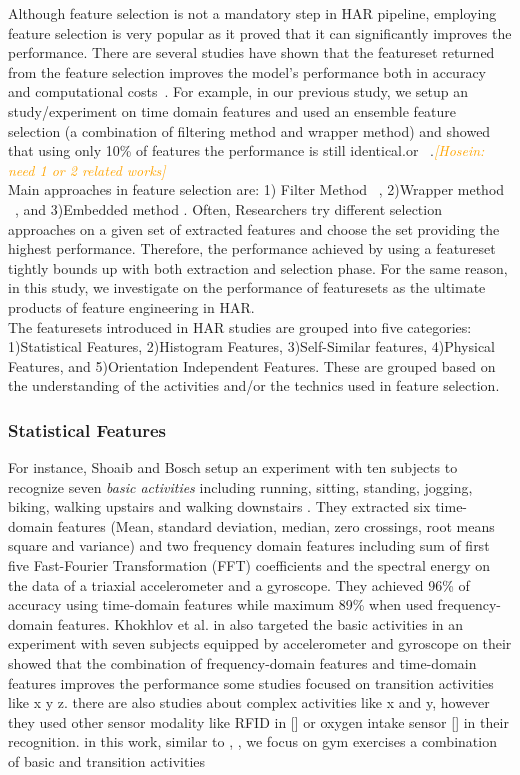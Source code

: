 \documentclass[journal,article,submit,moreauthors,pdftex]{Definitions/mdpi}
\newcommand{\hosein}[1]{\textcolor{orange}{{\it [Hosein: #1]}}}
\begin{document}
Although feature selection is not a mandatory step in HAR pipeline, employing feature selection is very popular as it proved that it can significantly improves the performance. There are several studies have shown that the featureset returned from the feature selection improves the model's performance both in accuracy and computational costs~\cite{rosati2018comparison, Nourani_CoMoRea2019, wang2019survey}. For example, in our previous study, we setup an study/experiment on time domain features and used an ensemble feature selection (a combination of filtering method and wrapper method) and showed that using only 10\% of features the performance is still identical.or ~\cite{yazdansepas2016multi}.\hosein{need 1 or 2 related works}\\
Main approaches in feature selection are: 1) Filter Method ~\cite{zhang2011feature}, 2)Wrapper method ~\cite{rosati2018comparison}, and 3)Embedded method \cite{Nourani_CoMoRea2019}.  Often, Researchers try different selection approaches on a given set of extracted features and choose the set providing the highest performance. Therefore, the performance achieved by using a featureset tightly bounds up with both extraction and selection phase. For the same reason, in this study, we investigate on the performance of  featuresets as the ultimate products of feature engineering in HAR.\\
The featuresets introduced in HAR studies are grouped into five categories: 1)Statistical Features, 2)Histogram Features, 3)Self-Similar features, 4)Physical Features, and 5)Orientation Independent Features. These are grouped based on the understanding of the activities and/or the technics used in feature selection. 

\subsubsection{Statistical Features}
For instance, Shoaib and Bosch setup an experiment with ten subjects to recognize seven \textit{basic activities} including running, sitting, standing, jogging, biking, walking upstairs and walking downstairs \cite{s140610146}. They extracted six time-domain features (Mean, standard deviation, median, zero crossings, root means square and variance) and two frequency domain features including sum of first five Fast-Fourier Transformation (FFT) coefficients and the spectral energy on the data of a triaxial accelerometer and a gyroscope. They achieved 96\% of accuracy using time-domain features while maximum 89\% when used frequency-domain features. Khokhlov et al. in \cite{khokhlov2018design} also targeted the basic activities in an experiment with seven subjects equipped by accelerometer and gyroscope on their showed that the combination of frequency-domain features and time-domain features improves the performance 
some studies focused on transition activities like x y z. there are also studies about complex activities like x and y, however they used other sensor modality like RFID in [] or oxygen intake sensor [] in their recognition. in this work, similar to \cite{morris2014recofit, }, , we focus on gym exercises a combination of basic and transition activities 
\end{document}
